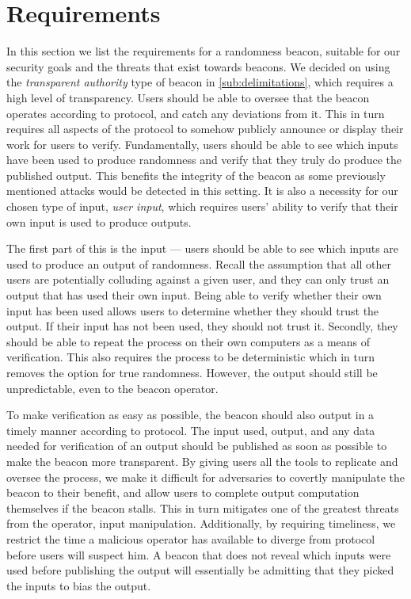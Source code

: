 \section{Requirements}%
\label{sec:beacon_requirements}
In this section we list the requirements for a randomness beacon, suitable for our security goals and the threats that exist towards beacons.
We decided on using the \emph{transparent authority} type of beacon in \cref{sub:delimitations}, which requires a high level of transparency.
Users should be able to oversee that the beacon operates according to protocol, and catch any deviations from it.
This in turn requires all aspects of the protocol to somehow publicly announce or display their work for users to verify.
Fundamentally, users should be able to see which inputs have been used to produce randomness and verify that they truly do produce the published output.
This benefits the integrity of the beacon as some previously mentioned attacks would be detected in this setting.
It is also a necessity for our chosen type of input, \emph{user input}, which requires users' ability to verify that their own input is used to produce outputs.

The first part of this is the input --- users should be able to see which inputs are used to produce an output of randomness.
Recall the assumption that all other users are potentially colluding against a given user, and they can only trust an output that has used their own input.
Being able to verify whether their own input has been used allows users to determine whether they should trust the output.
If their input has not been used, they should not trust it.
Secondly, they should be able to repeat the process on their own computers as a means of verification.
This also requires the process to be deterministic which in turn removes the option for true randomness.
However, the output should still be unpredictable, even to the beacon operator.

To make verification as easy as possible, the beacon should also output in a timely manner according to protocol.
The input used, output, and any data needed for verification of an output should be published as soon as possible to make the beacon more transparent.
By giving users all the tools to replicate and oversee the process, we make it difficult for adversaries to covertly manipulate the beacon to their benefit, and allow users to complete output computation themselves if the beacon stalls.
This in turn mitigates one of the greatest threats from the operator, input manipulation.
Additionally, by requiring timeliness, we restrict the time a malicious operator has available to diverge from protocol before users will suspect him.
A beacon that does not reveal which inputs were used before publishing the output will essentially be admitting that they picked the inputs to bias the output.

